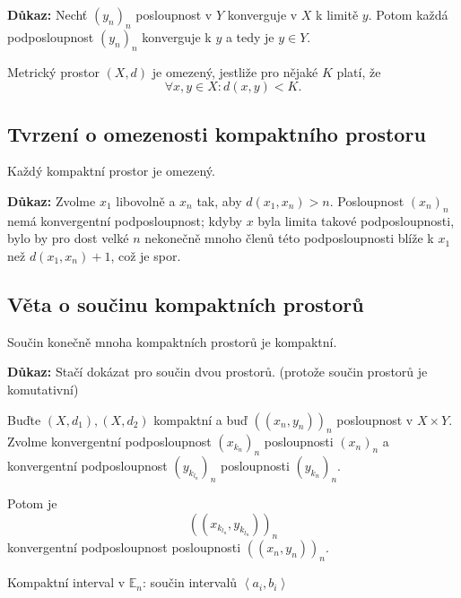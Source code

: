 \documentclass[../main.tex]{subfiles}
\begin{document}
\vspace{5mm}
\noindent
\textbf{Důkaz:} Nechť $(y_n)_n$ posloupnost v $Y$ konverguje v $X$ k limitě $y$. Potom každá podposloupnost $(y_n)_n$ konverguje k 
$y$ a tedy je $y \in Y$.
\begin{center}
    Metrický prostor $(X,d)$ je omezený, jestliže pro nějaké $K$ platí, že 
    \[\forall x,y \in X : d(x,y) < K.\]
\end{center}

\subsection{Tvrzení o omezenosti kompaktního prostoru}
\hspace{1.2mm}
\noindent
Každý kompaktní prostor je omezený.

\vspace{5mm}
\noindent
\textbf{Důkaz:} Zvolme $x_1$ libovolně a $x_n$ tak, aby $d(x_1,x_n) > n$. Posloupnost $(x_n)_n$ nemá konvergentní podposloupnost; kdyby $x$
byla limita takové podposloupnosti, bylo by pro dost velké $n$ nekonečně mnoho členů této podposloupnosti blíže k $x_1$ než $d(x_1,x_n)+1$, což je spor.

\subsection{Věta o součinu kompaktních prostorů}
\hspace{1.2mm}
\noindent
Součin konečně mnoha kompaktních prostorů je kompaktní.

\vspace{5mm}
\noindent
\textbf{Důkaz:} Stačí dokázat pro součin dvou prostorů. (protože součin prostorů je komutativní)

Buďte $(X,d_1), (X, d_2)$ kompaktní a buď $((x_n,y_n))_n$ posloupnost v $X \times Y$. 
Zvolme konvergentní podposloupnost $(x_{k_n})_n$ posloupnosti $(x_n)_n$ a konvergentní podposloupnost $(y_{k_{l_n}})_n$ posloupnosti $(y_{k_n})_n$.

Potom je 
\[((x_{k_{l_n}},y_{k_{l_n}}))_n\]
konvergentní podposloupnost posloupnosti $((x_n,y_n))_n$.

\begin{center}
    Kompaktní interval v $\mathbb{E}_n$: součin intervalů $\left<a_i,b_i\right>$
\end{center}
\end{document}
